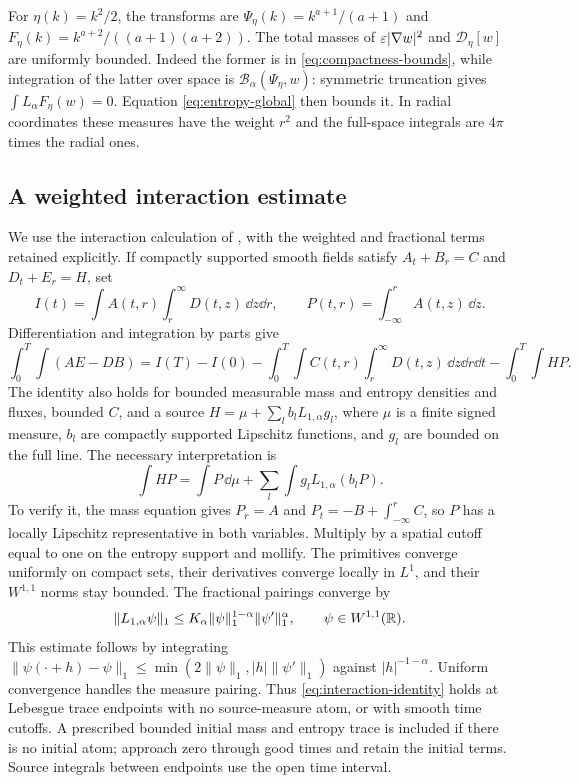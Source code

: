 For $\eta(k)=k^2/2$, the transforms are
$\Psi_\eta(k)=k^{a+1}/(a+1)$ and
$F_\eta(k)=k^{a+2}/((a+1)(a+2))$.
The total masses of $\varepsilon|\nabla w|^2$ and
$\mathcal D_\eta[w]$ are uniformly bounded. Indeed the former is in
\eqref{eq:compactness-bounds}, while integration of the latter over space
is $\mathcal B_\alpha(\Psi_\eta,w)$: symmetric truncation gives
$\int L_\alpha F_\eta(w)=0$. Equation \eqref{eq:entropy-global}
then bounds it. In radial coordinates these measures have the weight
$r^2$ and the full-space integrals are $4\pi$ times the radial ones.

\subsection{A weighted interaction estimate}

We use the interaction calculation of \cite[Section~2]{GolsePerthame2013},
with the weighted and fractional terms retained explicitly. If compactly
supported smooth fields satisfy
$A_t+B_r=C$ and $D_t+E_r=H$, set
\[
 I(t)=\int A(t,r)\int_r^\infty D(t,z)\,\dd z\dd r,
 \qquad P(t,r)=\int_{-\infty}^r A(t,z)\,\dd z.
\]
Differentiation and integration by parts give
\begin{equation}\label{eq:interaction-identity}
 \int_0^T\int(AE-DB)=I(T)-I(0)
 -\int_0^T\int C(t,r)\int_r^\infty D(t,z)\,\dd z\dd r\dd t
 -\int_0^T\int HP.
\end{equation}
The identity also holds for bounded measurable mass and entropy densities
and fluxes, bounded $C$, and a source
$H=\mu+\sum_l b_lL_{1,\alpha}g_l$, where $\mu$ is a finite signed
measure, $b_l$ are compactly supported Lipschitz functions, and $g_l$ are
bounded on the full line. The necessary interpretation is
\[
 \int HP=\int P\,\dd\mu+
             \sum_l\int g_lL_{1,\alpha}(b_lP).
\]
To verify it, the mass equation gives
$P_r=A$ and $P_t=-B+\int_{-\infty}^rC$, so $P$ has a locally Lipschitz
representative in both variables. Multiply by a spatial cutoff equal to
one on the entropy support and mollify. The primitives converge uniformly
on compact sets, their derivatives converge locally in $L^1$, and their
$W^{1,1}$ norms stay bounded. The fractional pairings converge by
\begin{equation}\label{eq:fractional-L1}
 \|L_{1,\alpha}\psi\|_1
 \leq K_\alpha\|\psi\|_1^{1-\alpha}\|\psi'\|_1^\alpha,
 \qquad \psi\in W^{1,1}(\mathbb R).
\end{equation}
This estimate follows by integrating
$\|\psi(\cdot+h)-\psi\|_1\leq
\min(2\|\psi\|_1,|h|\|\psi'\|_1)$ against $|h|^{-1-\alpha}$.
Uniform convergence handles the measure pairing. Thus
\eqref{eq:interaction-identity} holds at Lebesgue trace endpoints with no
source-measure atom, or with smooth time cutoffs. A prescribed bounded
initial mass and entropy trace is included if there is no initial atom;
approach zero through good times and retain the initial terms. Source
integrals between endpoints use the open time interval.

